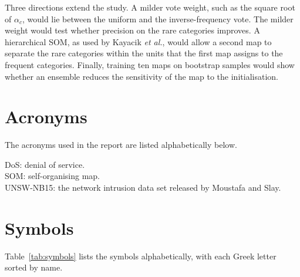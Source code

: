 \documentclass[conference,10pt]{IEEEtran}
\begin{document}
Three directions extend the study.
A milder vote weight, such as the square root of $\alpha_c$, would lie between the uniform and the inverse-frequency vote.
The milder weight would test whether precision on the rare categories improves.
A hierarchical SOM, as used by Kayacik \emph{et al.}, would allow a second map to separate the rare categories within the units that the first map assigns to the frequent categories.
Finally, training ten maps on bootstrap samples would show whether an ensemble reduces the sensitivity of the map to the initialisation.

\raggedbottom
\appendices
\section{Acronyms}
The acronyms used in the report are listed alphabetically below.

\noindent DoS: denial of service.\\
SOM: self-organising map.\\
UNSW-NB15: the network intrusion data set released by Moustafa and Slay.

\section{Symbols}
Table~\ref{tab:symbols} lists the symbols alphabetically, with each Greek letter sorted by name.
\end{document}
